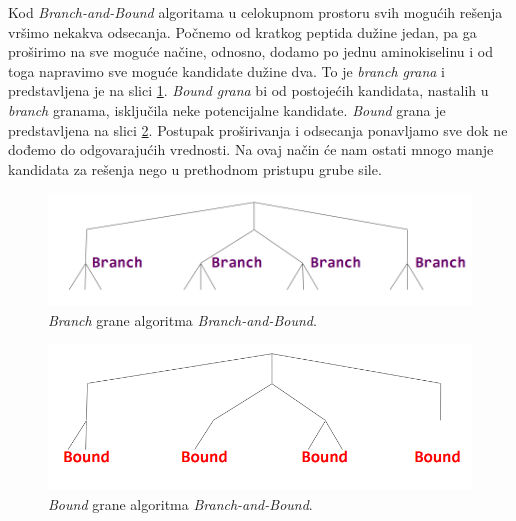 Kod \textit{Branch-and-Bound} algoritama u celokupnom prostoru svih mogućih rešenja vršimo nekakva odsecanja. Počnemo od kratkog peptida dužine jedan, pa ga proširimo na sve moguće načine, odnosno, dodamo po jednu aminokiselinu i od toga napravimo sve moguće kandidate dužine dva. To je \textit{branch grana} i predstavljena je na slici \ref{slika:branch}. \textit{Bound grana} bi od postojećih kandidata, nastalih u \textit{branch} granama, isključila neke potencijalne kandidate. \textit{Bound} grana je predstavljena na slici \ref{slika:bound}. Postupak proširivanja i odsecanja ponavljamo sve dok ne dođemo do odgovarajućih vrednosti. Na ovaj način će nam ostati mnogo manje kandidata za rešenja nego u prethodnom pristupu grube sile.

\iffalse
\begin{minipage}{\textwidth}
	\centering
	\begin{minipage}{0.45\textwidth}
		\begin{figure}[H]
			\centering
			\includegraphics[width=\textwidth]{poglavlja/4/slike/branch.png}
			\caption{\textit{Branch} grane algoritma \textit{Branch-and-Bound}.}
			\label{slika:branch}
		\end{figure} 
	\end{minipage}
	\hfill 
	\begin{minipage}{0.45\textwidth}
		\begin{figure}[H]
			\centering
			\includegraphics[width=\textwidth]{poglavlja/4/slike/bound.png}
			\caption{\textit{Bound} grane algoritma \textit{Branch-and-Bound}.}
			\label{slika:bound}
		\end{figure} 
	\end{minipage}
	\vspace*{1em}
\end{minipage}

